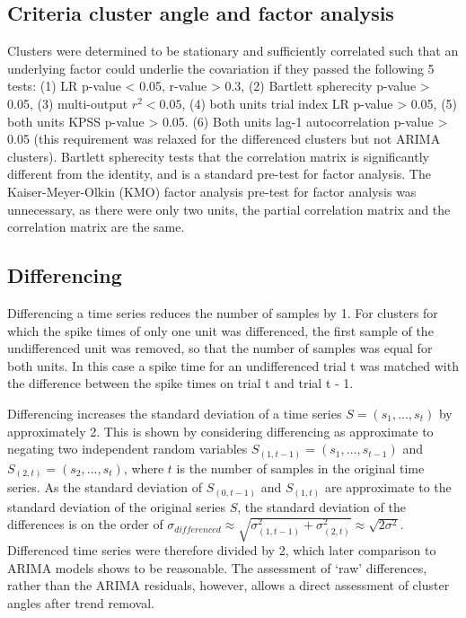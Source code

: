 \documentclass{article}
\begin{document}
\subsection{Criteria cluster angle and factor analysis}
\label{methods:angle_and_factor_analysis_criteria}

Clusters were determined to be stationary and sufficiently correlated such that an underlying factor could underlie the covariation if they passed the following 5 tests: (1) LR p-value < 0.05, r-value > 0.3, (2) Bartlett spherecity p-value > 0.05, (3) multi-output $r^2 < 0.05$, (4) both units trial index LR p-value > 0.05, (5) both units KPSS p-value > 0.05. (6) Both units lag-1 autocorrelation p-value > 0.05 (this requirement was relaxed for the differenced clusters but not ARIMA clusters). Bartlett spherecity tests that the correlation matrix is significantly different from the identity, and is a standard pre-test for factor analysis. The Kaiser-Meyer-Olkin (KMO) factor analysis pre-test for factor analysis was unnecessary, as there were only two units, the partial correlation matrix and the correlation matrix are the same.




\subsection{Differencing}
\label{methods:differencing}

Differencing a time series reduces the number of samples by 1.
For clusters for which the spike times of only one unit was differenced, the first sample of the undifferenced unit was removed, so that the number of samples was equal for both units. In this case a spike time for an undifferenced trial t was matched with the difference between the spike times on trial t and trial t - 1.

Differencing increases the standard deviation of a time series $S = (s_1, ..., s_t)$ by approximately 2. This is shown by considering differencing as approximate to negating two independent random variables $S_{(1, t-1)} = (s_1, ..., s_{t-1})$ and $S_{(2, t)} = (s_2, ..., s_t)$, where $t$ is the number of samples in the original time series. As the standard deviation of $S_{(0, t-1)}$ and $S_{(1, t)}$ are approximate to the standard deviation of the original series $S$, the standard deviation of the differences is on the order of \(\sigma_{differenced} \approx \sqrt{\sigma_{(1, t-1)}^2 + \sigma_{(2, t)}^2} \approx  \sqrt{2\sigma^2} \).  Differenced time series were therefore divided by 2, which later comparison to ARIMA models shows to be reasonable. The assessment of `raw' differences, rather than the ARIMA residuals, however, allows a direct assessment of cluster angles after trend removal.
\end{document}
